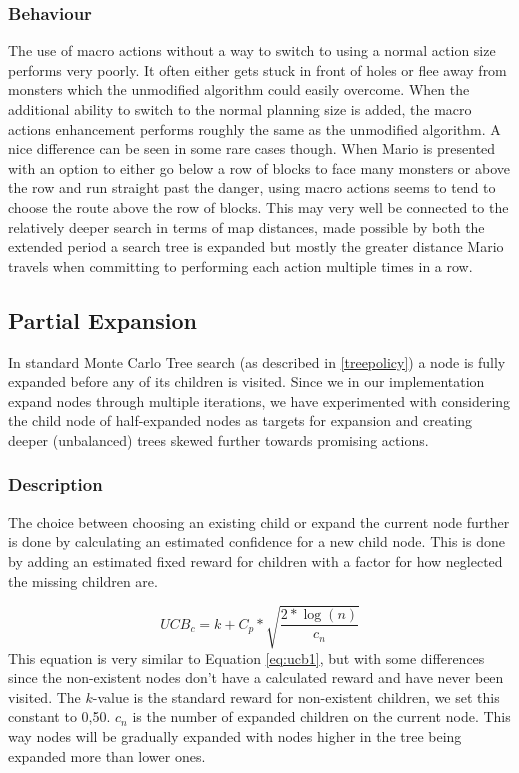 \documentclass[10pt,a4paper]{article}
\begin{document}
\subsubsection*{Behaviour}
The use of macro actions without a way to switch to using a normal action size performs very poorly. It often either gets stuck in front of holes or flee away from monsters which the unmodified algorithm could easily overcome. 
When the additional ability to switch to the normal planning size is added, the macro actions enhancement performs roughly the same as the unmodified algorithm. 
A nice difference can be seen in some rare cases though. When Mario is presented with an option to either go below a row of blocks to face many monsters or above the row and run straight past the danger, using macro actions seems to tend to choose the route above the row of blocks. 
This may very well be connected to the relatively deeper search in terms of map distances, made possible by both the extended period a search tree is expanded but mostly the greater distance Mario travels when committing to performing each action multiple times in a row.


\subsection{Partial Expansion}
In standard Monte Carlo Tree search (as described in \ref{treepolicy}) %
a node is fully expanded before any of its children is visited. Since we in our implementation expand nodes through multiple iterations, we have experimented with considering the child node of half-expanded nodes as targets for expansion and creating deeper (unbalanced) trees skewed further towards promising actions. 

\subsubsection*{Description}
The choice between choosing an existing child or expand the current node further is done by calculating an estimated confidence for a new child node. This is done by adding an estimated fixed reward for children with a factor for how neglected the missing children are.

\begin{equation}
\label{eq:partial_equation}
\displaystyle UCB_c = k + C_p * \sqrt{\frac{2 * \log(n)}{c_n}}
\end{equation}
This equation is very similar to Equation \ref{eq:ucb1}, but with some differences since the non-existent nodes don't have a calculated reward and have never been visited. The $k$-value is the standard reward for non-existent children, we set this constant to 0,50. $c_n$ is the number of expanded children on the current node. This way nodes will be gradually expanded with nodes higher in the tree being expanded more than lower ones.
\end{document}

